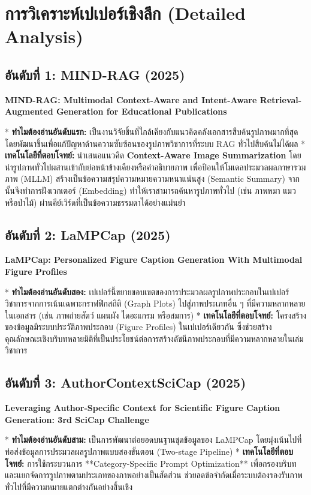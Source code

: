 \documentclass[10pt,a4paper]{article}
\begin{document}
\vspace{12pt}

\section*{การวิเคราะห์เปเปอร์เชิงลึก (Detailed Analysis)}

\subsection*{อันดับที่ 1: MIND-RAG (2025)}
\begin{highlight}
  \textbf{MIND-RAG: Multimodal Context-Aware and Intent-Aware Retrieval-Augmented Generation for Educational Publications}
\end{highlight}
* \textbf{ทำไมต้องอ่านอันดับแรก:} เป็นงานวิจัยชิ้นที่ใกล้เคียงกับแนวคิดคลังเอกสารสืบค้นรูปภาพมากที่สุด โดยพัฒนาขึ้นเพื่อแก้ปัญหาด้านความซับซ้อนของรูปภาพวิชาการที่ระบบ RAG ทั่วไปสืบค้นไม่ได้ผล
* \textbf{เทคโนโลยีที่ตอบโจทย์:} นำเสนอแนวคิด \textbf{Context-Aware Image Summarization} โดยนำรูปภาพทั่วไปผสานเข้ากับย่อหน้าข้างเคียงหรือคำอธิบายภาพ เพื่อป้อนให้โมเดลประมวลผลภาษารวมภาพ (MLLM) สร้างเป็นข้อความสรุปความหมายความหนาแน่นสูง (Semantic Summary) จากนั้นจึงทำการฝังเวกเตอร์ (Embedding) ทำให้เราสามารถค้นหารูปภาพทั่วไป (เช่น ภาพหมา แมว หรือป่าไม้) ผ่านคีย์เวิร์ดที่เป็นข้อความธรรมดาได้อย่างแม่นยำ

\subsection*{อันดับที่ 2: LaMPCap (2025)}
\begin{highlight}
  \textbf{LaMPCap: Personalized Figure Caption Generation With Multimodal Figure Profiles}
\end{highlight}
* \textbf{ทำไมต้องอ่านอันดับสอง:} เปเปอร์นี้ขยายขอบเขตของการประมวลผลรูปภาพประกอบในเปเปอร์วิชาการจากการเน้นเฉพาะกราฟฟิกสถิติ (Graph Plots) ไปสู่ภาพประเภทอื่น ๆ ที่มีความหลากหลายในเอกสาร (เช่น ภาพถ่ายสัตว์ แผนผัง ไดอะแกรม หรือสมการ)
* \textbf{เทคโนโลยีที่ตอบโจทย์:} โครงสร้างของข้อมูลมีระบบประวัติภาพประกอบ (Figure Profiles) ในเปเปอร์เดียวกัน ซึ่งช่วยสร้างคุณลักษณะเชิงบริบทหลายมิติที่เป็นประโยชน์ต่อการสร้างดัชนีภาพประกอบที่มีความหลากหลายในเล่มวิชาการ

\subsection*{อันดับที่ 3: AuthorContextSciCap (2025)}
\begin{highlight}
  \textbf{Leveraging Author-Specific Context for Scientific Figure Caption Generation: 3rd SciCap Challenge}
\end{highlight}
* \textbf{ทำไมต้องอ่านอันดับสาม:} เป็นการพัฒนาต่อยอดบนฐานชุดข้อมูลของ LaMPCap โดยมุ่งเน้นไปที่ท่อส่งข้อมูลการประมวลผลรูปภาพแบบสองขั้นตอน (Two-stage Pipeline)
* \textbf{เทคโนโลยีที่ตอบโจทย์:} การใช้กระบวนการ **Category-Specific Prompt Optimization** เพื่อกรองบริบทและแยกจัดการรูปภาพตามประเภทของภาพอย่างเป็นสัดส่วน ช่วยลดข้อจำกัดเมื่อระบบต้องรองรับภาพทั่วไปที่มีความหมายแตกต่างกันอย่างสิ้นเชิง
\end{document}
